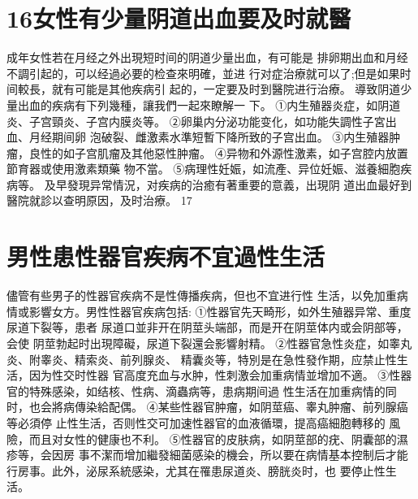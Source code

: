 \documentclass[12pt,UTF8]{ctexbook}
\begin{document}
\section{16女性有少量阴道出血要及时就醫}
成年女性若在月经之外出現短时间的阴道少量出血，有可能是
排卵期出血和月经不調引起的，可以经過必要的检查來明確，並进
行对症治療就可以了;但是如果时间較長，就有可能是其他疾病引
起的，一定要及时到醫院进行治療。
導致阴道少量出血的疾病有下列幾種，讓我們一起來瞭解一
下。
①内生殖器炎症，如阴道炎、子宫頸炎、子宫内膜炎等。
②卵巢内分泌功能变化，如功能失調性子宮出血、月经期间卵
泡破裂、雌激素水準短暫下降所致的子宫出血。
③内生殖器肿瘤，良性的如子宫肌瘤及其他惡性肿瘤。
④异物和外源性激素，如子宫腔内放置節育器或使用激素類藥
物不當。
⑤病理性妊娠，如流產、异位妊娠、滋養細胞疾病等。
及早發現异常情況，对疾病的治癒有著重要的意義，出現阴
道出血最好到醫院就診以查明原因，及时治療。
17
\section{男性患性器官疾病不宜過性生活}
儘管有些男子的性器官疾病不是性傳播疾病，但也不宜进行性
生活，以免加重病情或影響女方。男性性器官疾病包括:
①性器官先天畸形，如外生殖器异常、重度尿道下裂等，患者
尿道口並非开在阴莖头端部，而是开在阴莖体内或会阴部等，会使
阴莖勃起时出現障礙，尿道下裂還会影響射精。
②性器官急性炎症，如睾丸炎、附睾炎、精索炎、前列腺炎、
精囊炎等，特別是在急性發作期，应禁止性生活，因为性交时性器
官高度充血与水肿，性刺激会加重病情並增加不適。
③性器官的特殊感染，如结核、性病、滴蟲病等，患病期间過
性生活在加重病情的同时，也会將病傳染給配偶。
④某些性器官肿瘤，如阴莖癌、睾丸肿瘤、前列腺癌等必須停
止性生活，否则性交可加速性器官的血液循環，提高癌細胞轉移的
風險，而且对女性的健康也不利。
⑤性器官的皮肤病，如阴莖部的疣、阴囊部的濕疹等，会因房
事不潔而增加繼發細菌感染的機会，所以要在病情基本控制后才能
行房事。此外，泌尿系統感染，尤其在罹患尿道炎、膀胱炎时，也
要停止性生活。
\end{document}
